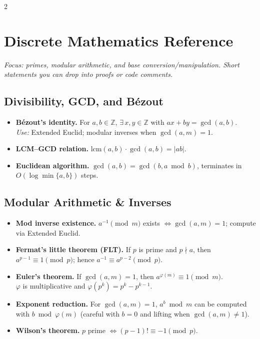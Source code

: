 \documentclass[10pt]{article}
\theoremstyle{definition}
\begin{document}
\begin{multicols*}{2}
\clearpage

\section{Discrete Mathematics Reference}\label{app:discrete}
\textit{Focus: primes, modular arithmetic, and base conversion/manipulation. Short statements you can drop into proofs or code comments.}

\subsection{Divisibility, GCD, and Bézout}
\begin{itemize}
  \item \textbf{Bézout's identity.} For $a,b\in\mathbb{Z}$, $\exists\,x,y\in\mathbb{Z}$ with $ax+by=\gcd(a,b)$. \\
        \emph{Use:} Extended Euclid; modular inverses when $\gcd(a,m)=1$.
  \item \textbf{LCM--GCD relation.} $\mathrm{lcm}(a,b)\cdot \gcd(a,b)=|ab|$.
  \item \textbf{Euclidean algorithm.} $\gcd(a,b)=\gcd(b,a\bmod b)$, terminates in $O(\log\min\{a,b\})$ steps.
\end{itemize}

\subsection{Modular Arithmetic \& Inverses}
\begin{itemize}
  \item \textbf{Mod inverse existence.} $a^{-1}\pmod m$ exists $\iff \gcd(a,m)=1$; compute via Extended Euclid.
  \item \textbf{Fermat's little theorem (FLT).} If $p$ is prime and $p\nmid a$, then $a^{p-1}\equiv 1\pmod p$; hence $a^{-1}\equiv a^{p-2}\pmod p$.
  \item \textbf{Euler's theorem.} If $\gcd(a,m)=1$, then $a^{\varphi(m)}\equiv 1\pmod m$. \\
        $\varphi$ is multiplicative and $\varphi(p^k)=p^k-p^{k-1}$.
  \item \textbf{Exponent reduction.} For $\gcd(a,m)=1$, $a^b\bmod m$ can be computed with $b\bmod \varphi(m)$ (careful with $b=0$ and lifting when $\gcd(a,m)\ne 1$).
  \item \textbf{Wilson's theorem.} $p$ prime $\iff (p-1)!\equiv -1\pmod p$.
\end{itemize}


\end{multicols*}
\end{document}
